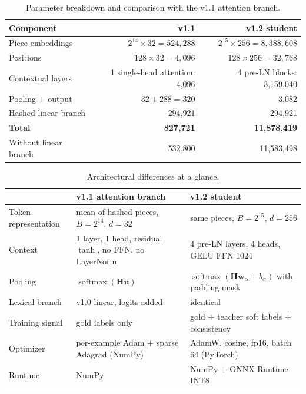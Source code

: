 \documentclass[11pt,a4paper]{article}
\theoremstyle{remark}
\DeclareMathOperator{\softmax}{softmax}
\begin{document}
\begin{table}[h]
\centering\small
\caption{Parameter breakdown and comparison with the v1.1 attention branch.}
\label{tab:params}
\begin{tabular}{@{}l r r@{}}
\toprule
Component & v1.1 & v1.2 student \\
\midrule
Piece embeddings & $2^{14}\times32 = 524{,}288$ & $2^{15}\times256 = 8{,}388{,}608$ \\
Positions & $128\times32 = 4{,}096$ & $128\times256 = 32{,}768$ \\
Contextual layers & 1 single-head attention: 4{,}096 & 4 pre-LN blocks: 3{,}159{,}040 \\
Pooling $+$ output & $32 + 288 = 320$ & 3{,}082 \\
Hashed linear branch & 294{,}921 & 294{,}921 \\
\midrule
\textbf{Total} & \textbf{827{,}721} & \textbf{11{,}878{,}419} \\
Without linear branch & 532{,}800 & 11{,}583{,}498 \\
\bottomrule
\end{tabular}
\end{table}

\begin{table}[h]
\centering\small
\caption{Architectural differences at a glance.}
\label{tab:archdiff}
\begin{tabularx}{\linewidth}{@{}l X X@{}}
\toprule
& v1.1 attention branch & v1.2 student \\
\midrule
Token representation & mean of hashed pieces, $B=2^{14}$, $d=32$ & same pieces, $B=2^{15}$, $d=256$ \\
Context & 1 layer, 1 head, residual $\tanh$, no FFN, no LayerNorm & 4 pre-LN layers, 4 heads, GELU FFN 1024 \\
Pooling & $\softmax(\bm H\bm u)$ & $\softmax(\bm H\bm w_\alpha + b_\alpha)$ with padding mask \\
Lexical branch & v1.0 linear, logits added & identical \\
Training signal & gold labels only & gold $+$ teacher soft labels $+$ consistency \\
Optimizer & per-example Adam $+$ sparse Adagrad (NumPy) & AdamW, cosine, fp16, batch 64 (PyTorch) \\
Runtime & NumPy & NumPy $+$ ONNX Runtime INT8 \\
\bottomrule
\end{tabularx}
\end{table}
\end{document}
